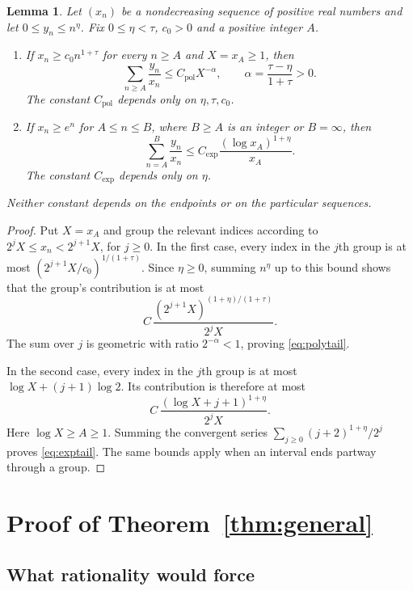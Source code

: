 \documentclass[11pt]{article}
\newtheorem{lemma}[theorem]{Lemma}
\numberwithin{equation}{section}
\begin{document}
\begin{lemma}\label{lem:tails}
Let $(x_n)$ be a nondecreasing sequence of positive real numbers and let
$0\le y_n\le n^\eta$. Fix $0\le\eta<\tau$, $c_0>0$ and a positive
integer $A$.
\begin{enumerate}
\item If $x_n\ge c_0 n^{1+\tau}$ for every $n\ge A$ and $X=x_A\ge1$,
then
\begin{equation}\label{eq:polytail}
  \sum_{n\ge A}\frac{y_n}{x_n}
  \le C_{\mathrm{pol}}X^{-\alpha},
  \qquad \alpha=\frac{\tau-\eta}{1+\tau}>0.
\end{equation}
The constant $C_{\mathrm{pol}}$ depends only on $\eta,\tau,c_0$.
\item If $x_n\ge e^n$ for $A\le n\le B$, where $B\ge A$ is an integer
or $B=\infty$, then
\begin{equation}\label{eq:exptail}
  \sum_{n=A}^{B}\frac{y_n}{x_n}
  \le C_{\mathrm{exp}}\frac{(\log x_A)^{1+\eta}}{x_A}.
\end{equation}
The constant $C_{\mathrm{exp}}$ depends only on $\eta$.
\end{enumerate}
Neither constant depends on the endpoints or on the particular
sequences.
\end{lemma}

\begin{proof}
Put $X=x_A$ and group the relevant indices according to
$2^jX\le x_n<2^{j+1}X$, for $j\ge0$.
In the first case, every index in the $j$th group is at most
$(2^{j+1}X/c_0)^{1/(1+\tau)}$. Since $\eta\ge0$, summing $n^\eta$
up to this bound shows that the group's contribution is at most
\[
  C\,\frac{(2^{j+1}X)^{(1+\eta)/(1+\tau)}}{2^jX}.
\]
The sum over $j$ is geometric with ratio $2^{-\alpha}<1$, proving
\eqref{eq:polytail}.

In the second case, every index in the $j$th group is at most
$\log X+(j+1)\log2$. Its contribution is therefore at most
\[
  C\,\frac{(\log X+j+1)^{1+\eta}}{2^jX}.
\]
Here $\log X\ge A\ge1$. Summing the convergent series
$\sum_{j\ge0}(j+2)^{1+\eta}/2^j$ proves \eqref{eq:exptail}.
The same bounds apply when an interval ends partway through a group.
\end{proof}

\section{Proof of Theorem~\ref{thm:general}}\label{sec:proof}

\subsection{What rationality would force}
\end{document}
